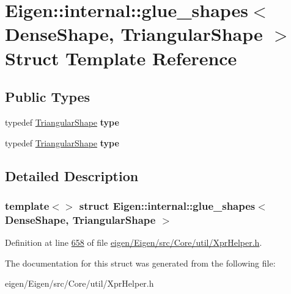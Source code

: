 \hypertarget{struct_eigen_1_1internal_1_1glue__shapes_3_01_dense_shape_00_01_triangular_shape_01_4}{}\section{Eigen\+:\+:internal\+:\+:glue\+\_\+shapes$<$ Dense\+Shape, Triangular\+Shape $>$ Struct Template Reference}
\label{struct_eigen_1_1internal_1_1glue__shapes_3_01_dense_shape_00_01_triangular_shape_01_4}
\subsection*{Public Types}
\begin{DoxyCompactItemize}
\item 
\mbox{\label{struct_eigen_1_1internal_1_1glue__shapes_3_01_dense_shape_00_01_triangular_shape_01_4_a659c56d0a32aac0772b3605c5fa488db}} 
typedef \hyperlink{struct_eigen_1_1_triangular_shape}{Triangular\+Shape} {\bfseries type}
\item 
\mbox{\label{struct_eigen_1_1internal_1_1glue__shapes_3_01_dense_shape_00_01_triangular_shape_01_4_a659c56d0a32aac0772b3605c5fa488db}} 
typedef \hyperlink{struct_eigen_1_1_triangular_shape}{Triangular\+Shape} {\bfseries type}
\end{DoxyCompactItemize}


\subsection{Detailed Description}
\subsubsection*{template$<$$>$\newline
struct Eigen\+::internal\+::glue\+\_\+shapes$<$ Dense\+Shape, Triangular\+Shape $>$}



Definition at line \hyperlink{eigen_2_eigen_2src_2_core_2util_2_xpr_helper_8h_source_l00658}{658} of file \hyperlink{eigen_2_eigen_2src_2_core_2util_2_xpr_helper_8h_source}{eigen/\+Eigen/src/\+Core/util/\+Xpr\+Helper.\+h}.



The documentation for this struct was generated from the following file\+:\begin{DoxyCompactItemize}
\item 
eigen/\+Eigen/src/\+Core/util/\+Xpr\+Helper.\+h\end{DoxyCompactItemize}
